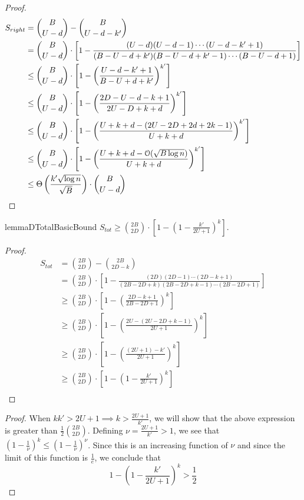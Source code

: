 \DRightBound*
\begin{proof}
\begin{align}
S_{right} &= {{B}\choose{U-d}}-{{B}\choose{U-d-k'}}\\
&= {{B}\choose{U-d}}\cdot \left[1-\frac{(U-d)(U-d-1)\cdots(U-d-k'+1)}{(B-U-d+k')(B-U-d+k'-1)\cdots(B-U-d+1)}\right]\\
&\le {{B}\choose{U-d}}\cdot \left[1-\left(\frac{U-d-k'+1}{B-U+d+k'}\right)^{k'}\right]\\
&\le {{B}\choose{U-d}}\cdot \left[1-\left(\frac{2D-U-d-k+1}{2U-D+k+d}\right)^{k'}\right]\\
&\le {{B}\choose{U-d}}\cdot \left[1-\left(\frac{U+k+d - (2U-2D+2d+2k-1)}{U+k+d}\right)^{k'}\right]\\
&\le {{B}\choose{U-d}}\cdot \left[1-\left(\frac{U+k+d - \Bo(\sqrt{B\log n})}{U+k+d}\right)^{k'}\right]\\
&\le \Theta\left(\frac{k'\sqrt{\log n}}{\sqrt{B}}\right)\cdot{{B}\choose{U-d}}
\end{align}
\end{proof}

\begin{restatable}{lemma}{DTotalBasicBound}
\label{lem:DTotalBasicBound}
$S_{tot} \ge {{2B}\choose{2D}}\cdot \left[1-\left(1 - \frac{k'}{2U+1}\right)^k\right]$.
\end{restatable}
\begin{proof}
\begin{align}
S_{tot} &= {{2B}\choose{2D}}-{{2B}\choose{2D-k}}\\
&= {{2B}\choose{2D}}\cdot \left[1-\frac{(2D)(2D-1)\cdots(2D-k+1)}{(2B-2D+k)(2B-2D+k-1)\cdots(2B-2D+1)}\right]\\
&\ge {{2B}\choose{2D}}\cdot \left[1-\left(\frac{2D-k+1}{2B-2D+1}\right)^k\right]\\
&\ge {{2B}\choose{2D}}\cdot \left[1-\left(\frac{2U-(2U-2D+k-1)}{2U+1}\right)^k\right]\\
&\ge {{2B}\choose{2D}}\cdot \left[1-\left(\frac{(2U+1)-k'}{2U+1}\right)^k\right]\\
&\ge {{2B}\choose{2D}}\cdot \left[1-\left(1 - \frac{k'}{2U+1}\right)^k\right]\\
\end{align}
\end{proof}

\DTotalFarBoundary*
\begin{proof}
When $kk' > 2U + 1 \implies k > \frac{2U+1}{k'}$,
we will show that the above expression is greater than $\frac 12 \binom{2B}{2D}$.
Defining $\nu = \frac{2U+1}{k'} > 1$, we see that $(1-\frac 1\nu)^k \le (1-\frac 1\nu)^\nu$.
Since this is an increasing function of $\nu$ and since the limit of this function is $\frac 1e$,
we conclude that
\[
1-\left(1 - \frac{k'}{2U+1}\right)^k > \frac 12
\]
\end{proof}

